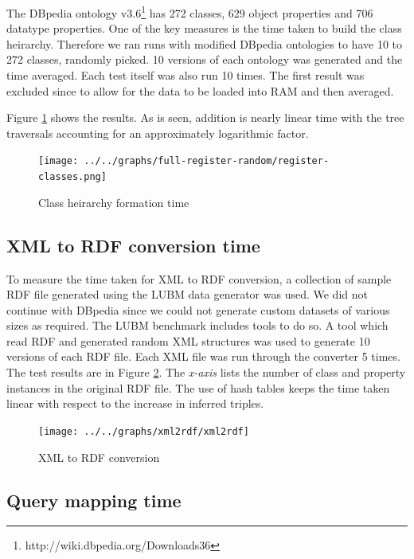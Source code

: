 \documentclass[journal]{IEEEtran}
\begin{document}
The DBpedia ontology
v3.6\footnote{http://wiki.dbpedia.org/Downloads36} has 272 classes, 629 object
properties and 706 datatype properties. One of the key measures is the time
taken to build the class heirarchy. Therefore we ran runs with modified DBpedia
ontologies to have
10 to 272 classes, randomly picked. 10 versions of each ontology was generated
and the time averaged. Each test itself was also run 10 times. The first
result was excluded since to allow for the data to be loaded into RAM and
then averaged.

Figure \ref{fig:eval:cs-ch-form} shows the results. As is seen, addition is
nearly linear time with the tree traversals
accounting for an approximately logarithmic factor.

\begin{figure}[h]
    \centering
    \texttt{[image: ../../graphs/full-register-random/register-classes.png]}
    \caption{Class heirarchy formation time}
    \label{fig:eval:cs-ch-form}
\end{figure}

\subsection{XML to RDF conversion time}

To measure the time taken for XML to RDF conversion, a collection of sample RDF
file generated using the LUBM data generator was used. We did not continue with
DBpedia since we could not generate custom datasets of various sizes as
required. The LUBM benchmark includes tools to do so. A tool which read RDF and
generated random XML structures was used to generate 10 versions of each RDF
file. Each XML file was run through the converter 5 times. The test results are
in Figure \ref{fig:eval:xml2rdf}. The \emph{x-axis} lists the number of class
and property instances in the original RDF file. The use of hash tables keeps
the time taken linear with respect to the increase in inferred triples.

\begin{figure}[h]
    \centering
    \texttt{[image: ../../graphs/xml2rdf/xml2rdf]}
    \caption{XML to RDF conversion}
    \label{fig:eval:xml2rdf}
\end{figure}

\subsection{Query mapping time}
\end{document}

